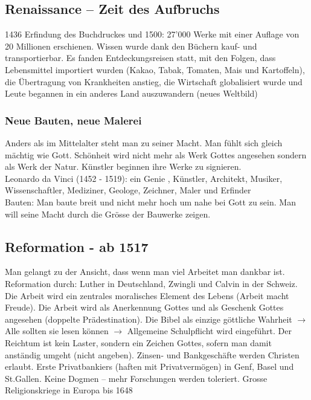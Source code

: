 \documentclass[10pt, openright=true]{scrartcl}
\begin{document}
\subsection{Renaissance – Zeit des Aufbruchs}
1436 Erfindung des Buchdruckes und 1500: 27'000 Werke mit einer Auflage von 20 Millionen erschienen. Wissen wurde dank den Büchern kauf- und transportierbar. Es fanden Entdeckungsreisen statt, mit den Folgen, dass Lebensmittel importiert wurden (Kakao, Tabak, Tomaten, Mais und Kartoffeln), die Übertragung von Krankheiten anstieg, die Wirtschaft globalisiert wurde und Leute begannen in ein anderes Land auszuwandern (neues Weltbild)
\subsubsection{Neue Bauten, neue Malerei}
Anders als im Mittelalter steht man zu seiner Macht. Man fühlt sich gleich mächtig wie Gott. Schönheit wird nicht mehr als Werk Gottes angesehen sondern als Werk der Natur. Künstler beginnen ihre Werke zu signieren.\\
Leonardo da Vinci (1452 - 1519): ein \glqq Genie \grqq, Künstler, Architekt, Musiker, Wissenschaftler, Mediziner, Geologe, Zeichner, Maler und Erfinder\\
Bauten: Man baute breit und nicht mehr hoch um nahe bei Gott zu sein. Man will seine Macht durch die Grösse der Bauwerke zeigen. 

\subsection{Reformation - ab 1517}
Man gelangt zu der Ansicht, dass wenn man viel Arbeitet man dankbar ist. Reformation durch: Luther in Deutschland, Zwingli und Calvin in der Schweiz. Die Arbeit wird ein zentrales moralisches Element des Lebens (Arbeit macht Freude). Die Arbeit wird als Anerkennung Gottes und als Geschenk Gottes angesehen (doppelte Prädestination). Die Bibel als einzige göttliche Wahrheit $ \rightarrow $ Alle sollten sie lesen können $ \rightarrow $ Allgemeine Schulpflicht wird eingeführt. Der Reichtum ist kein Laster, sondern ein Zeichen Gottes, sofern man damit anständig umgeht (nicht angeben). Zinsen- und Bankgeschäfte werden Christen erlaubt. Erste Privatbankiers (haften mit Privatvermögen) in Genf, Basel und St.Gallen. Keine Dogmen – mehr Forschungen werden toleriert. Grosse Religionskriege in Europa bis 1648
\end{document}
